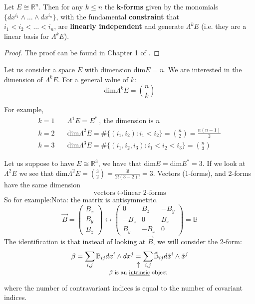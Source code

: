 \documentclass[../main.tex]{subfiles}
\begin{document}
\begin{proposition}
Let $E\cong\mathbb{R}^n$. Then for any $k\le n$ the \textbf{k-forms} given by the monomials $\{dx^{i_1}\wedge\dots\wedge dx^{i_n}\}$, with the fundamental \textbf{constraint} that\\
$i_1<i_2<\dots<i_n$, are \textbf{linearly independent} and generate $\Lambda^k E$ (i.e. they are a linear basis for $\Lambda^k E$).
\end{proposition}
\begin{proof}
The proof can be found in Chapter 1 of .
\end{proof}
\begin{corollary}
Let us consider a space $E$ with dimension $\textrm{dim}E=n$. We are interested in the dimension of $\Lambda^k E$.
For a general value of $k$: \[\textrm{dim}\Lambda^k E=\binom{n}{k}\]
\end{corollary}
For example,
    \[
    \begin{split}
    \boxed{k=1}\quad &\Lambda^1 E=E^\ast\ , \ \textrm{the dimension is }n\\
    \boxed{k=2}\quad &\textrm{dim}\Lambda^2 E=\texttt{\#}\{(i_1,i_2):i_1<i_2\}=\binom{n}{2}=\frac{n(n-1)}{2}\\
    \boxed{k=3}\quad &\textrm{dim}\Lambda^3 E=\texttt{\#}\{(i_1,i_2,i_3):i_1<i_2<i_3\}=\binom{n}{3}
    \end{split}
    \]
\begin{kaobox}[frametitle=Remark: the miracle of $\mathbb{R}^3$]
Let us suppose to have $E\cong\mathbb{R}^3$, we have that $\textrm{dim}E=\textrm{dim}E^*=3$. If we look at $\Lambda^2 E$ we see that dim$\Lambda^2 E=\binom{3}{2}=\frac{3!}{2!(3-2)!}=3$.
Vectors (1-forms), and 2-forms have the same dimension
\[
\textrm{vectors} \ \longleftrightarrow \textrm{linear 2-forms}
\]
So for example:\textrm{Nota: the matrix is antisymmetric.}
\[
\vec{B}=\begin{pmatrix}
B_x\\B_y\\B_z
\end{pmatrix}\longleftrightarrow\begin{pmatrix}
0 & B_z & -B_y\\
-B_z & 0 & B_x\\
B_y & -B_x & 0
\end{pmatrix}=\mathbb{B}
\]
The identification is that instead of looking at $\vec{B}$, we will consider the 2-form:
\[
\beta=\sum_{i,j} \mathbb{B}_{ij}dx^i\wedge dx^j\underset{\mathclap{\tikz \node {$\uparrow$} node [below=1ex] {\footnotesize $\beta$ is an \underline{intrinsic} object};}}{=}\sum_{i,j} \Tilde{\mathbb{B}}_{ij}d\Tilde{x}^i\wedge\Tilde{x}^j
\]
where the number of contravariant indices is equal to the number of covariant indices.
\end{kaobox}
\end{document}
